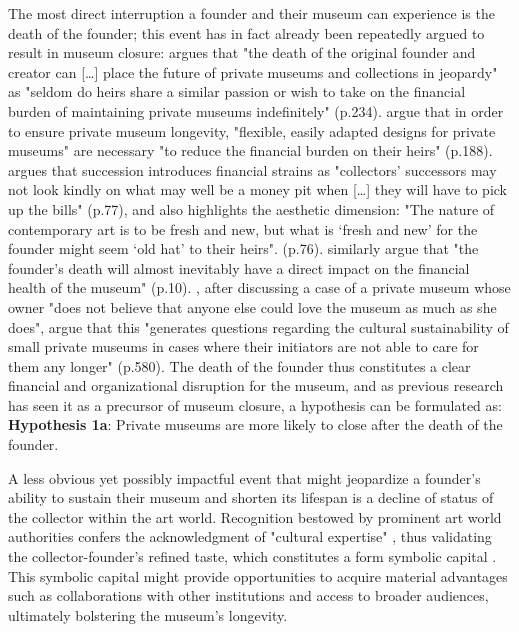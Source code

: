 \documentclass[12pt]{article}
\begin{document}
The most direct interruption a founder and their museum can experience is the death of the founder; this event has in fact already been repeatedly argued to result in museum closure:
\textcite{Walker_2019_collector} argues that "the death of the original founder and creator can [\ldots{}] place the future of private museums and collections in jeopardy" as "seldom do heirs share a similar passion or wish to take on the financial burden of maintaining private museums indefinitely" (p.234). 
\textcite{Bechtler_Imhof_2018_future} argue that in order to ensure private museum longevity, "flexible, easily adapted designs for private museums" are necessary "to reduce the financial burden on their heirs" (p.188).
\textcite{Adam_2021_rise} argues that succession introduces financial strains as "collectors’ successors may not look kindly on what may well be a money pit when [\ldots{}] they will have to pick up the bills" (p.77), and also highlights the aesthetic dimension: "The nature of contemporary art is to be fresh and new, but what is ‘fresh and new’ for the founder might seem ‘old hat’ to their heirs". (p.76).
\textcite{Velthuis_Gera_2024_fragility} similarly argue that "the founder’s death will almost inevitably have a direct impact on the financial health of the museum" (p.10).
\textcite{StylianouLambert_etal_2014_museums}, after discussing a case of a private museum whose owner "does not believe that anyone else could love the museum as much as she does", argue that this "generates questions regarding the cultural sustainability of small private museums in cases where their initiators are not able to care for them any longer" (p.580).
The death of the founder thus constitutes a clear financial and organizational disruption for the museum, and as previous research has seen it as a precursor of museum closure, a hypothesis can be formulated as:
\bigbreak
\noindent
\textbf{Hypothesis 1a}: Private museums are more likely to close after the death of the founder.



A less obvious yet possibly impactful event that might jeopardize a founder's ability to sustain their museum and shorten its lifespan is a decline of status of the collector within the art world.
Recognition bestowed by prominent art world authorities confers the acknowledgment of "cultural expertise" \parencite[p.1486]{Braden_2016_recognition}, thus validating the collector-founder's refined taste, which constitutes a form symbolic capital \parencite{Bourdieu_1993_production}.
This symbolic capital might provide opportunities to acquire material advantages such as collaborations with other institutions and access to broader audiences, ultimately bolstering the museum's longevity.
\end{document}
